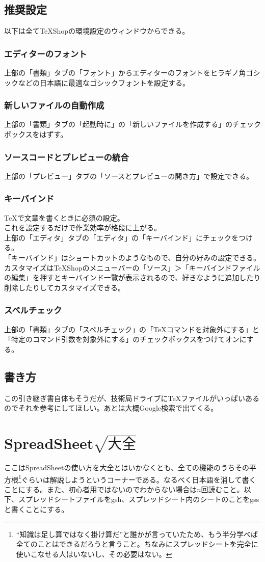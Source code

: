\documentclass[dvipdfmx,jb5]{jreport}
\begin{document}
\subsection{推奨設定}
以下は全てTeXShopの環境設定のウィンドウからできる。
\subsubsection{エディターのフォント}
上部の「書類」タブの「フォント」からエディターのフォントをヒラギノ角ゴシックなどの日本語に最適なゴシックフォントを設定する。
\subsubsection{新しいファイルの自動作成}
上部の「書類」タブの「起動時に」の「新しいファイルを作成する」のチェックボックスをはずす。
\subsubsection{ソースコードとプレビューの統合}
上部の「プレビュー」タブの「ソースとプレビューの開き方」で設定できる。
\subsubsection{キーバインド}
\TeX で文章を書くときに必須の設定。\\
これを設定するだけで作業効率が格段に上がる。\\
上部の「エディタ」タブの「エディタ」の「キーバインド」にチェックをつける。\\
「キーバインド」はショートカットのようなもので、自分の好みの設定できる。カスタマイズはTeXShopのメニューバーの「ソース」＞「キーバインドファイルの編集」を押すとキーバインド一覧が表示されるので、好きなように追加したり削除したりしてカスタマイズできる。
\subsubsection{スペルチェック}
上部の「書類」タブの「スペルチェック」の「\TeX コマンドを対象外にする」と「特定のコマンド引数を対象外にする」のチェックボックスをつけてオンにする。
\subsection{書き方}
この引き継ぎ書自体もそうだが、技術局ドライブに\TeX ファイルがいっぱいあるのでそれを参考にしてほしい。あとは大概Google検索で出てくる。
\section{SpreadSheet$\sqrt{大全}$}
ここはSpreadSheetの使い方を大全とはいかなくとも、全ての機能のうちその平方根\footnote{``知識は足し算ではなく掛け算だ''と誰かが言っていたため、もう半分学べば全てのことはできるだろうと言うこと。ちなみにスプレッドシートを完全に使いこなせる人はいないし、その必要はない。}ぐらいは解説しようというコーナーである。なるべく日本語を消して書くことにする。また、初心者用ではないのでわからない場合は$n$回読むこと。以下、スプレッドシートファイルをgsh、スプレッドシート内のシートのことをgssと書くことにする。
\end{document}
